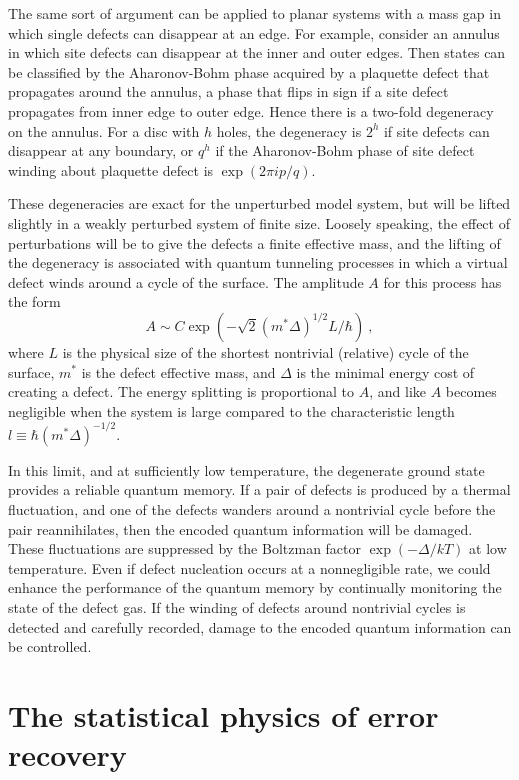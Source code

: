 The same sort of argument can be applied to planar systems with a mass gap in which single defects can disappear at an edge. For example, consider an annulus in which site defects can disappear at the inner and outer edges. Then states can be classified by the Aharonov-Bohm phase acquired by a plaquette defect that propagates around the annulus, a phase that flips in sign if a site defect propagates from inner edge to outer edge. Hence there is a two-fold degeneracy on the annulus. For a disc with $h$ holes, the degeneracy is $2^h$ if site defects can disappear at any boundary, or $q^h$ if the Aharonov-Bohm phase of site defect winding about plaquette defect is $\exp(2\pi i p/q)$. 

These degeneracies are exact for the unperturbed model system, but will be lifted slightly in a weakly perturbed system of finite size. Loosely speaking, the effect of perturbations will be to give the defects a finite effective mass, and the lifting of the degeneracy is associated with quantum tunneling processes in which a virtual defect winds around a cycle of the surface. The amplitude $A$ for this process has the form 
\begin{equation}
A\sim C\exp\left(-\sqrt{2} (m^*\Delta)^{1/2}L/\hbar\right)~,
\end{equation}
where $L$ is the physical size of the shortest nontrivial (relative) cycle of the surface, $m^*$ is the defect effective mass, and $\Delta$ is the minimal energy cost of creating a defect.  The energy splitting is proportional to $A$, and like $A$ becomes negligible when the system is large compared to the characteristic length $l\equiv \hbar (m^*\Delta)^{-1/2}$. 

In this limit, and at sufficiently low temperature, the degenerate ground state provides a reliable quantum memory. 
If a pair of defects is produced by a thermal fluctuation, and one of the defects wanders around a nontrivial cycle before the pair reannihilates, then the encoded quantum information will be damaged. These fluctuations are suppressed by the Boltzman factor $\exp(-\Delta/kT)$ at low temperature. Even if defect nucleation occurs at a nonnegligible rate, we could enhance the performance of the quantum memory by continually monitoring the state of the defect gas. If the winding of defects around nontrivial cycles is detected and carefully recorded, damage to the encoded quantum information can be controlled.

\section{The statistical physics of error recovery}
\label{sec:statphys}

